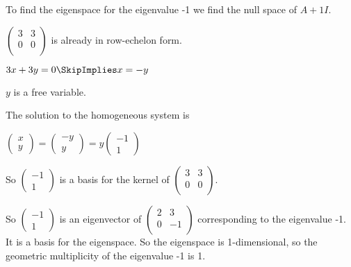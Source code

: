 \documentclass[oneside,12pt]{amsart}
\begin{document}
\bigskip

\bigskip

To find the eigenspace for the eigenvalue -1 we find the null space of $A+1I$.

\bigskip

$
\begin{pmatrix}
3 & 3 \\
0 & 0 \\
\end{pmatrix}
$
is already in row-echelon form.

\bigskip

$3x+3y=0 \SkipImplies x=-y$

\bigskip

$y$ is a free variable.

\bigskip

The solution to the homogeneous system is

\bigskip


$
\begin{pmatrix}
x \\ y
\end{pmatrix}
=
\begin{pmatrix}
-y \\ y
\end{pmatrix}
=
y
\begin{pmatrix}
-1 \\ 1
\end{pmatrix}
$

\bigskip

So
$
\begin{pmatrix}
-1 \\ 1
\end{pmatrix}
$
is a basis for the kernel of
$
\begin{pmatrix}
3 & 3 \\
0 & 0 \\
\end{pmatrix}
$.

\bigskip


So
$
\begin{pmatrix}
-1 \\ 1
\end{pmatrix}
$
is an eigenvector of
$
\begin{pmatrix}
2 & 3 \\
0 & -1 \\
\end{pmatrix}
$
corresponding to the eigenvalue -1. It is a basis for the eigenspace.
So the eigenspace is 1-dimensional, so the geometric
multiplicity of the eigenvalue -1 is 1.
\end{document}
